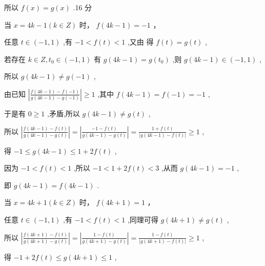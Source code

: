 \documentclass[10pt]{article}
\newcommand*\circled[1]{\tikz[baseline=(char.base)]{\node[shape=circle,draw,inner sep=1.5pt] (char) {\small #1};}}
\begin{document}
所以 \(f\left( x\right)  = g\left( x\right)\) .16 分

 \circled{2}  当 \(x = {4k} - 1\left( {k \in  Z}\right)\) 时， \(f\left( {{4k} - 1}\right)  =  - 1\) ，

任意 \(t \in  \left( {-1,1}\right)\) ,有 \(- 1 < f\left( t\right)  < 1\) ,又由 \circled{1} 得 \(f\left( t\right)  = g\left( t\right)\) ,

若存在 \(k \in  Z,{t}_{0} \in  \left( {-1,1}\right)\) 有 \(g\left( {{4k} - 1}\right)  = g\left( {t}_{0}\right)\) ,则 \(g\left( {{4k} - 1}\right)  \in  \left( {-1,1}\right)\) ,

所以 \(g\left( {{4k} - 1}\right)  \neq  g\left( {-1}\right)\) ,

由已知 \(\left| \frac{f\left( {{4k} - 1}\right)  - f\left( {-1}\right) }{g\left( {{4k} - 1}\right)  - g\left( {-1}\right) }\right|  \geq  1\) ,其中 \(f\left( {{4k} - 1}\right)  = f\left( {-1}\right)  =  - 1\) ,

于是有 \(0 \geq  1\) ,矛盾,所以 \(g\left( {{4k} - 1}\right)  \neq  g\left( t\right)\) ,

所以 \(\left| \frac{f\left( {{4k} - 1}\right)  - f\left( t\right) }{g\left( {{4k} - 1}\right)  - g\left( t\right) }\right|  = \left| \frac{-1 - f\left( t\right) }{g\left( {{4k} - 1}\right)  - g\left( t\right) }\right|  = \frac{1 + f\left( t\right) }{\left| g\left( 4k - 1\right)  - f\left( t\right) \right| } \geq  1\) ,

得 \(- 1 \leq  g\left( {{4k} - 1}\right)  \leq  1 + {2f}\left( t\right)\) ,

因为 \(- 1 < f\left( t\right)  < 1\) ,所以 \(- 1 < 1 + {2f}\left( t\right)  < 3\) ,从而 \(g\left( {{4k} - 1}\right)  =  - 1\) ,

即 \(g\left( {{4k} - 1}\right)  = f\left( {{4k} - 1}\right)\) .

 \circled{3}  当 \(x = {4k} + 1\left( {k \in  Z}\right)\) 时， \(f\left( {{4k} + 1}\right)  = 1\) ，

任意 \(t \in  \left( {-1,1}\right)\) ,有 \(- 1 < f\left( t\right)  < 1\) ,同理可得 \(g\left( {{4k} + 1}\right)  \neq  g\left( t\right)\) ,

所以 \(\left| \frac{f\left( {{4k} + 1}\right)  - f\left( t\right) }{g\left( {{4k} + 1}\right)  - g\left( t\right) }\right|  = \left| \frac{1 - f\left( t\right) }{g\left( {{4k} + 1}\right)  - g\left( t\right) }\right|  = \frac{1 - f\left( t\right) }{\left| g\left( 4k + 1\right)  - f\left( t\right) \right| } \geq  1\) ,

得 \(- 1 + {2f}\left( t\right)  \leq  g\left( {{4k} + 1}\right)  \leq  1\) ,
\end{document}
